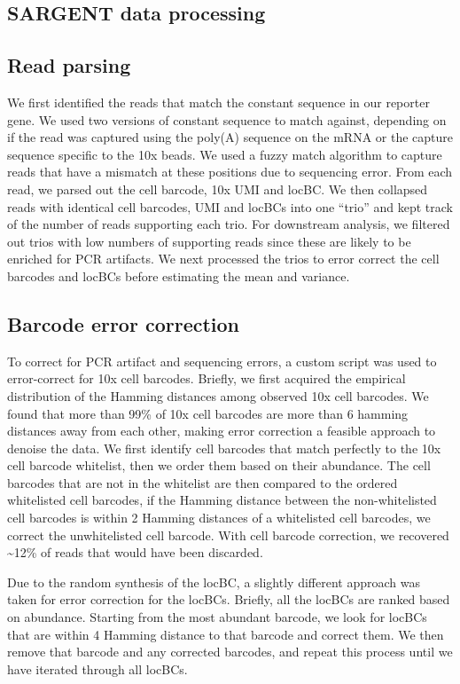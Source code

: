 \subsection*{SARGENT data processing}
\subsection*{Read parsing}

We first identified the reads that match the constant sequence in our reporter gene. We used two versions of constant sequence to match against, depending on if the read was captured using the poly(A) sequence on the mRNA or the capture sequence specific to the 10x beads. We used a fuzzy match algorithm to capture reads that have a mismatch at these positions due to sequencing error. From each read, we parsed out the cell barcode, 10x UMI and locBC. We then collapsed reads with identical cell barcodes, UMI and locBCs into one \enquote{trio} and kept track of the number of reads supporting each trio. For downstream analysis, we filtered out trios with low numbers of supporting reads since these are likely to be enriched for PCR artifacts. We next processed the trios to error correct the cell barcodes and locBCs before estimating the mean and variance. 

\subsection*{Barcode error correction}

To correct for PCR artifact and sequencing errors, a custom script was used to error-correct for 10x cell barcodes. Briefly, we first acquired the empirical distribution of the Hamming distances among observed 10x cell barcodes. We found that more than 99\% of 10x cell barcodes are more than 6 hamming distances away from each other, making error correction a feasible approach to denoise the data. We first identify cell barcodes that match perfectly to the 10x cell barcode whitelist, then we order them based on their abundance. The cell barcodes that are not in the whitelist are then compared to the ordered whitelisted cell barcodes, if the Hamming distance between the non-whitelisted cell barcodes is within 2 Hamming distances of a whitelisted cell barcodes, we correct the unwhitelisted cell barcode. With cell barcode correction, we recovered \textasciitilde12\% of reads that would have been discarded. 

Due to the random synthesis of the locBC, a slightly different approach was taken for error correction for the locBCs. Briefly, all the locBCs are ranked based on abundance. Starting from the most abundant barcode, we look for locBCs that are within 4 Hamming distance to that barcode and correct them. We then remove that barcode and any corrected barcodes, and repeat this process until we have iterated through all locBCs.

